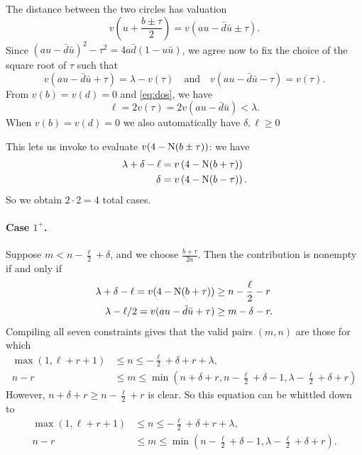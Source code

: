 The distance between the two circles has valuation
\[
  v\left( u + \frac{b \pm \tau}{2} \right)
  = v(au - \bar d \bar u \pm \tau).
\]
Since $(au-\bar d \bar u)^2 - \tau^2 = 4a\bar d(1- u\bar u)$,
we agree now to fix the choice of the square root of $\tau$ such that
\begin{equation}
  v(au-\bar d \bar u + \tau) = \lambda - v(\tau) \quad\text{and}\quad
  v(au-\bar d \bar u - \tau) = v(\tau).
  \label{eq:tau_choice}
\end{equation}
From $v(b) = v(d) = 0$ and \eqref{eq:dos}, we have
\[ \ell = 2v(\tau) = 2v(au - \bar d \bar u) < \lambda. \]
When $v(b) = v(d) = 0$ we also automatically have $\delta, \ell \ge 0$

This lets us invoke \cite[Lemma 4.7]{ref:AFL} to evaluate $v(4-\operatorname{N}(b \pm \tau))$:
we have
\begin{align*}
  \lambda + \delta - \ell &= v\left( 4 - \operatorname{N}(b+\tau) \right) \\
  \delta &= v\left( 4 - \operatorname{N}(b-\tau) \right).
\end{align*}
So we obtain $2 \cdot 2 = 4$ total cases.

\paragraph{Case $1^+$.}
Suppose $m < n - \frac{\ell}{2} + \delta$, and we choose $\frac{b+\tau}{2a}$.
Then the contribution is nonempty if and only if
\begin{align*}
  \lambda + \delta - \ell = v(4-\operatorname{N}(b+\tau)) &\geq n - \frac{\ell}{2} - r \\
  \lambda - \ell/2 = v(au-\bar d \bar u + \tau) & \geq m - \delta - r.
\end{align*}
Compiling all seven constraints gives that the valid pairs $(m,n)$ are those for which
\begin{align*}
  \max(1, \ell+r+1) &\leq n \leq -\frac{\ell}{2} + \delta + r + \lambda, \\
  n-r &\leq m \leq \min\left( n+\delta+r, n - \frac{\ell}{2}+\delta - 1,
    \lambda-\frac{\ell}{2}+\delta+r \right)
\end{align*}
However, $n + \delta + r \ge n - \frac{\ell}{2} + r$ is clear.
So this equation can be whittled down to
\begin{equation}
  \begin{aligned}
    \max(1, \ell+r+1) &\leq n \leq  -\frac{\ell}{2} + \delta + r + \lambda, \\
    n-r &\leq m \leq \min\left( n - \frac{\ell}{2}+\delta - 1,
      \lambda-\frac{\ell}{2}+\delta+r \right).
  \end{aligned}
  \label{eq:even_case1_plus}
\end{equation}

